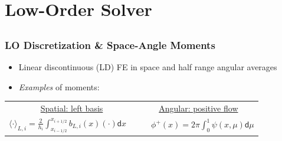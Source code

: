 \documentclass[xcolor=dvipsnames]{beamer}
\newlength{\wideitemsep}
\let\olditem\item
\renewcommand{\item}{\setlength{\itemsep}{\wideitemsep}\olditem}
\renewcommand{\d}{\mathsf{d}}
\newcommand{\mom}[1]{\langle #1 \rangle}
\newcommand{\il}{{i-1/2}}
\newcommand{\ir}{{i+1/2}}
\begin{document}
\section{Low-Order Solver}
\subsection{}

\begin{frame}
    \frametitle{LO Discretization \& Space-Angle Moments}
    \begin{itemize}
        \item Linear discontinuous (LD) FE in space and half range
            angular averages 
    \end{itemize}
    \begin{centering}
    \end{centering}
    \begin{itemize}
    \pause
\item \emph{Examples} of moments:
    \end{itemize}
    \begin{center}
    \begin{tabular}{cc}
        \underline{Spatial: left basis} & \underline{Angular: positive flow} \\ 
        $ {\displaystyle \mom{\cdot}_{L,i} = \frac{2}{h_i} \int_{x_\il}^{x_\ir}
        b_{L,i}(x)(\cdot) \d x \quad }$  & ${ \quad \displaystyle \phi^+(x) = 2\pi\int_0^1 \psi(x,\mu) \d \mu}$
    \end{tabular}
    \end{center}

\end{frame}
\end{document}
